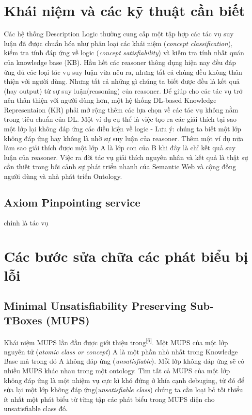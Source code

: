 \section{Khái niệm và các kỹ thuật cần biết}
Các hệ thống Description Logic thường cung cấp một tập hợp các tác vụ suy luận đã được chuẩn hóa như phân loại các khái niệm (\textit{concept classification}), kiểm tra tính đáp ứng về logic (\textit{concept satisfiability}) và kiếm tra tính nhất quán của knowledge base (KB). Hầu hết các reasoner thông dụng hiện nay đều đáp ứng đủ các loại tác vụ suy luận vừa nêu ra, nhưng tất cả chúng đều không thân thiện với người dùng. Nhưng tất cả những gì chúng ta biết được đều là kết quả (hay output) từ sự suy luận(reasoning) của reasoner. 
\hspace{0.05\textwidth}  Để giúp cho các tác vụ trở nên thân thiện với người dùng hơn, một hệ thống DL-based Knowledge Representaion (KR) phải mở rộng thêm các lựa chọn về các tác vụ không nằm trong tiêu chuẩn của DL. Một ví dụ cụ thể là việc tạo ra các giải thích tại sao một lớp lại không đáp ứng các điều kiện về logic - Lưu ý: chúng ta biết một lớp không đáp ứng hay không là nhờ sự suy luận của reasoner. Thêm một ví dụ nữa làm sao giải thích được một lớp A là lớp con của B khi đây là chỉ kết quả suy luận của reasoner. Việc ra đời tác vụ giải thích nguyên nhân và kết quả là thật sự cần thiết trong bối cảnh sự phát triển nhanh của Semantic Web và cộng đồng người dùng và nhà phát triển Ontology.
\subsection{Axiom Pinpointing service} chính là tác vụ 


\section{Các bước sửa chữa các phát biểu bị lỗi}

\subsection{Minimal Unsatisfiability Preserving Sub-TBoxes (MUPS)}
Khái niệm MUPS lần đầu được giới thiệu trong\textsuperscript{[6]}. Một MUPS của một lớp nguyên tử (\textit{atomic class or concept}) A là một phần nhỏ nhất trong  Knowledge Base mà trong đó A không đáp ứng (\textit{unsatisfiable}). Mỗi lớp không đáp ứng sẽ có nhiều MUPS khác nhau trong một ontology. Tìm tất cả MUPS của một lớp không đáp ứng là một nhiệm vụ cực kì khó đứng ở khía cạnh debuging, từ đó để sửa lại một lớp không đáp ứng(\textit{unsatisfiable class}) chúng ta cần loại bỏ tối thiểu ít nhất một phát biểu từ từng tập các phát biểu trong MUPS diện cho unsatisfiable class đó.
